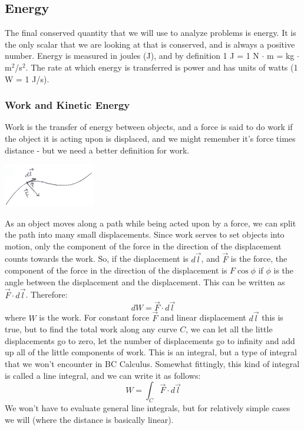 \subsection{Energy}
The final conserved quantity that we will use to analyze problems is energy. It is the only scalar that we are looking at that is conserved, and is always a positive number. Energy is measured in joules (J), and by definition 1 J = 1 N $\cdot$ m = kg $\cdot$ m$^2$/s$^2$. The rate at which energy is transferred is power and has units of watts (1 W = 1 J/s). 
\subsubsection{Work and Kinetic Energy}
Work is the transfer of energy between objects, and a force is said to do work if the object it is acting upon is displaced, and we might remember it's force times distance - but we need a better definition for work. 
\begin{center}
	\includegraphics[width=0.3\textwidth]{images/mechintro/work.png}\\
\end{center}
As an object moves along a path while being acted upon by a force, we can split the path into many small displacements. Since work serves to set objects into motion, only the component of the force in the direction of the displacement counts towards the work. So, if the displacement is $d \vec l$, and $\vec F$ is the force, the component of the force in the direction of the displacement is $F \cos \phi$ if $\phi$ is the angle between the displacement and the displacement. This can be written as $\vec F \cdot d\vec l$. Therefore:
\[
	dW = \vec F \cdot d\vec l
\]
where $W$ is the work. For constant force $\vec F$ and linear displacement $d \vec l$ this is true, but to find the total work along any curve $C$, we can let all the little displacements go to zero, let the number of displacements go to infinity and add up all of the little components of work. This is an integral, but a type of integral that we won't encounter in BC Calculus. Somewhat fittingly, this kind of integral is called a line integral, and we can write it as follows:
\[
	W = \int_C \vec F \cdot d\vec l
\]
We won't have to evaluate general line integrals, but for relatively simple cases we will (where the distance is basically linear). \\
